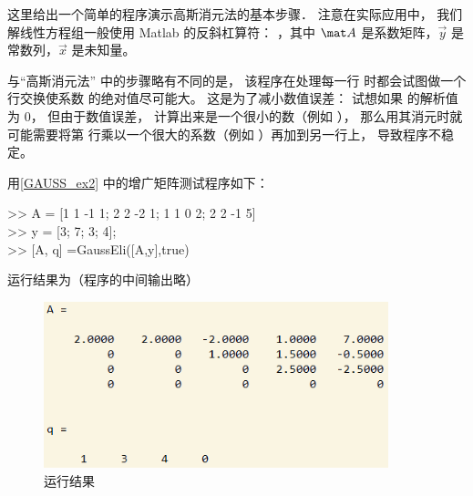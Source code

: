 

这里给出一个简单的程序演示高斯消元法的基本步骤． 注意在实际应用中， 我们解线性方程组一般使用 Matlab 的反斜杠算符： ，其中 $\mat A$ 是系数矩阵，$\vec y$ 是常数列，$\vec x$ 是未知量。


与“高斯消元法” 中的步骤略有不同的是， 该程序在处理每一行   时都会试图做一个行交换使系数  的绝对值尽可能大。 这是为了减小数值误差： 试想如果  的解析值为 0， 但由于数值误差， 计算出来是一个很小的数（例如 ）， 那么用其消元时就可能需要将第  行乘以一个很大的系数（例如 ）再加到另一行上， 导致程序不稳定。

用\autoref{GAUSS_ex2} 中的增广矩阵测试程序如下：

\begin{Command}
>> A = [1 1 -1 1; 2 2 -2 1; 1 1 0 2; 2 2 -1 5]\\
>> y = [3; 7; 3; 4];\\
>> [A, q] =GaussEli([A,y],true)
\end{Command}

运行结果为（程序的中间输出略）
\begin{figure}[ht]
\centering
\includegraphics[width=10cm]{./figures/GauEli1.png}
\caption{运行结果} \label{GauEli_fig1}
\end{figure}
